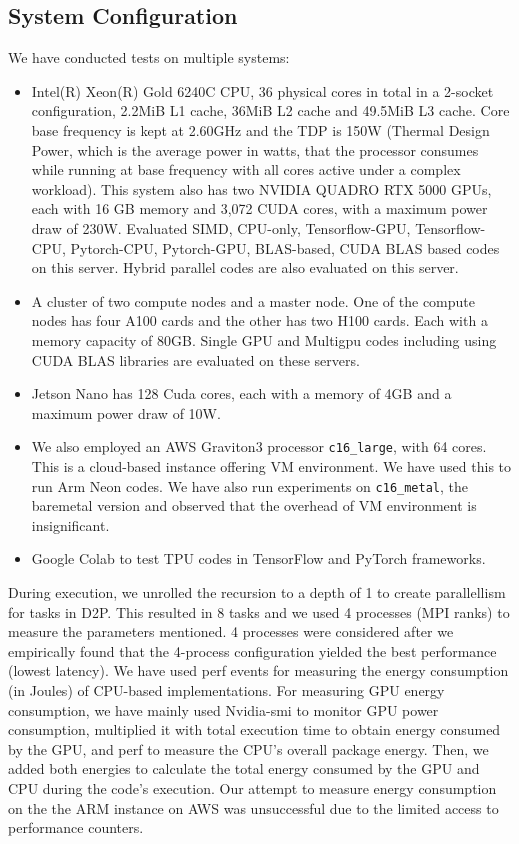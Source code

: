 \subsection{System Configuration}
We have conducted tests on multiple systems: 
\begin{itemize}
\item Intel(R) Xeon(R) Gold 6240C CPU, 36 physical cores in total in a 2-socket configuration, 2.2MiB L1 cache, 36MiB L2 cache and 49.5MiB L3 cache. Core base frequency is kept at 2.60GHz and the TDP is 150W (Thermal Design Power, which is the average power in watts, that the processor consumes while running at base frequency with all cores active under a complex workload). This system also has two NVIDIA QUADRO RTX 5000 GPUs, each with 16 GB memory and 3,072 CUDA cores, with a maximum power draw of 230W. Evaluated SIMD, CPU-only, Tensorflow-GPU, Tensorflow-CPU, Pytorch-CPU, Pytorch-GPU, BLAS-based, CUDA BLAS based codes on this server. Hybrid parallel codes are also evaluated on this server. 
\item A cluster of two compute nodes and a master node. One of the compute nodes has four A100 cards and the other has two H100 cards. Each with a memory capacity of 80GB. Single GPU and Multigpu codes including using CUDA BLAS libraries are evaluated on these servers. 
\item Jetson Nano has 128 Cuda cores, each with a memory of 4GB and a maximum power draw of 10W.
\item We also employed an AWS Graviton3 processor \texttt{c16\_large}, with 64 cores. This is a cloud-based instance offering VM environment. We have used this to run Arm Neon codes. We have also run experiments on \texttt{c16\_metal}, the baremetal version and observed that the overhead of VM environment is insignificant.
\item Google Colab to test TPU codes in TensorFlow and PyTorch frameworks.
\end{itemize}

During execution, we unrolled the recursion to a depth of 1 to create parallellism for tasks in D2P. This resulted in 8 tasks and we used 4 processes (MPI ranks) to measure the parameters mentioned. 4 processes were considered after we empirically found that the 4-process configuration yielded the best performance (lowest latency). 
We have used perf events for measuring the energy consumption (in Joules) of CPU-based implementations. For measuring GPU energy consumption, we have mainly used Nvidia-smi to monitor GPU power consumption, multiplied it with total execution time to obtain energy consumed by the GPU, and perf to measure the CPU’s overall package energy. Then, we added both energies to calculate the total energy consumed by the GPU and CPU
during the code’s execution.
Our attempt to measure energy consumption on the
the ARM instance on AWS was unsuccessful due to the limited access to performance counters.




